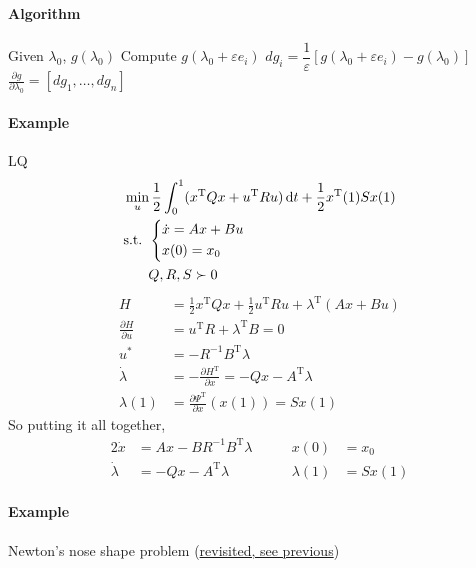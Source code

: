 \documentclass[letterpaper,12pt,titlepage]{report}
\newcommand*\dif{\mathop{}\!\mathrm{d}}
\newcommand{\trans}{^\text{T}}
\newcommand*\pder[2]{\frac{\partial #1}{\partial #2}}
\theoremstyle{plain}
\theoremstyle{definition}
\begin{document}
\paragraph{Algorithm} \mbox{}
\begin{algorithm}
  \begin{algorithmic}
    \State Given $\lambda_0$, $g(\lambda_0)$
    \State Compute $g(\lambda_0+\varepsilon e_i)$
    \State $dg_i = \dfrac{1}{\varepsilon} [g(\lambda_0+\varepsilon e_i) - g(\lambda_0)]$
    \EndFor
    \smallskip
    \State $\displaystyle\pder{g}{\lambda_0} = [dg_1,\dots,dg_n]$
  \end{algorithmic}
\end{algorithm}

\paragraph{Example} LQ
\begin{align}
  & \min_u \frac12 \int_0^1 (x\trans Qx + u\trans Ru) \dif t + \frac12 x\trans(1)Sx(1) \\
  & \text{s.t. } \begin{dcases}
    \dot x = Ax + Bu \\
    x(0) = x_0
  \end{dcases} \\
  & \phantom{\text{s.t. }} Q,R,S \succ 0
\end{align}
\begin{align}
  H &= \frac12 x\trans Qx + \frac12 u\trans Ru + \lambda\trans(Ax+Bu) \\
  \pder{H}{u} &= u\trans R + \lambda\trans B = 0 \\
  u^* &= -R^{-1}B\trans \lambda \\
  \dot\lambda &= -\pder{H\trans}{x} = -Qx - A\trans\lambda \\
  \lambda(1) &= \pder{\Psi\trans}{x}(x(1)) = Sx(1)
\end{align}
So putting it all together,
\begin{alignat}{2}
  \dot x &= Ax - BR^{-1}B\trans\lambda \qquad & x(0) &= x_0 \\
  \dot\lambda &= -Qx - A\trans\lambda & \lambda(1) &= Sx(1)
\end{alignat}

\paragraph{Example} Newton's nose shape problem (\hyperlink{newton_nose_shape}{revisited, see previous})
\end{document}
